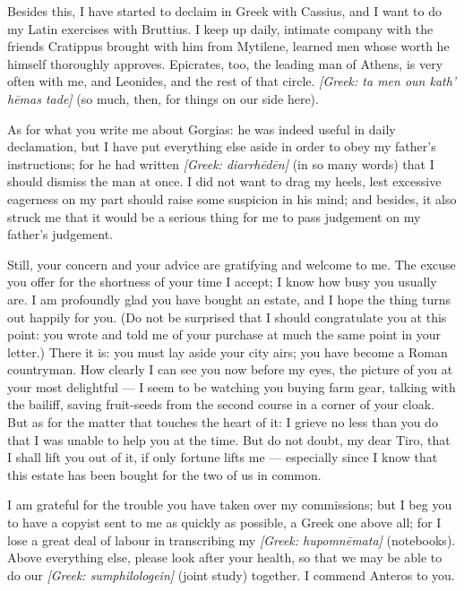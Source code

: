  Besides this, I have started to declaim in Greek with Cassius, and I want to do my Latin exercises with Bruttius. I keep up daily, intimate company with the friends Cratippus brought with him from Mytilene, learned men whose worth he himself thoroughly approves. Epicrates, too, the leading man of Athens, is very often with me, and Leonides, and the rest of that circle. \textit{[Greek: ta men oun kath' h\=emas tade]} (so much, then, for things on our side here).

 As for what you write me about Gorgias: he was indeed useful in daily declamation, but I have put everything else aside in order to obey my father's instructions; for he had written \textit{[Greek: diarrh\=ed\=en]} (in so many words) that I should dismiss the man at once. I did not want to drag my heels, lest excessive eagerness on my part should raise some suspicion in his mind; and besides, it also struck me that it would be a serious thing for me to pass judgement on my father's judgement.

 Still, your concern and your advice are gratifying and welcome to me. The excuse you offer for the shortness of your time I accept; I know how busy you usually are. I am profoundly glad you have bought an estate, and I hope the thing turns out happily for you. (Do not be surprised that I should congratulate you at this point: you wrote and told me of your purchase at much the same point in your letter.) There it is: you must lay aside your city airs; you have become a Roman countryman. How clearly I can see you now before my eyes, the picture of you at your most delightful --- I seem to be watching you buying farm gear, talking with the bailiff, saving fruit-seeds from the second course in a corner of your cloak. But as for the matter that touches the heart of it: I grieve no less than you do that I was unable to help you at the time. But do not doubt, my dear Tiro, that I shall lift you out of it, if only fortune lifts me --- especially since I know that this estate has been bought for the two of us in common.

 I am grateful for the trouble you have taken over my commissions; but I beg you to have a copyist sent to me as quickly as possible, a Greek one above all; for I lose a great deal of labour in transcribing my \textit{[Greek: hupomn\=emata]} (notebooks). Above everything else, please look after your health, so that we may be able to do our \textit{[Greek: sumphilologein]} (joint study) together. I commend Anteros to you.


